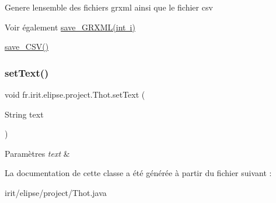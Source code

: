 Genere l\textquotesingle{}ensemble des fichiers grxml ainsi que le fichier csv \begin{DoxySeeAlso}{Voir également}
\mbox{\hyperlink{classfr_1_1irit_1_1elipse_1_1project_1_1_thot_a0434fbedf5ed08fba68adb12bb8bb72e}{save\+\_\+\+G\+R\+X\+M\+L(int i)}} 

\mbox{\hyperlink{classfr_1_1irit_1_1elipse_1_1project_1_1_thot_ac49a3db580727813ecd301c504737b2d}{save\+\_\+\+C\+S\+V()}}
\end{DoxySeeAlso}
\mbox{\label{classfr_1_1irit_1_1elipse_1_1project_1_1_thot_a4b23a42489aee4837e08348f288c4616}} 
\subsubsection{\texorpdfstring{setText()}{setText()}}
{\footnotesize\ttfamily void fr.\+irit.\+elipse.\+project.\+Thot.\+set\+Text (\begin{DoxyParamCaption}\item[{String}]{text }\end{DoxyParamCaption})}


\begin{DoxyParams}{Paramètres}
{\em text} & \\
\hline
\end{DoxyParams}


La documentation de cette classe a été générée à partir du fichier suivant \+:\begin{DoxyCompactItemize}
\item 
irit/elipse/project/Thot.\+java\end{DoxyCompactItemize}
